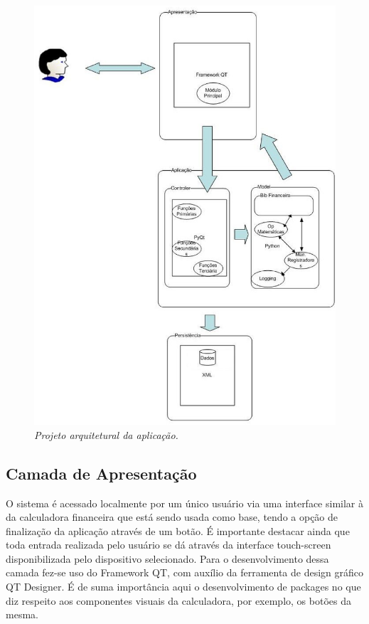 \begin{figure}[!h]
 \includegraphics[scale=0.5]{arquitetura.eps}
 \caption{\it Projeto arquitetural da aplicação.} \label{fig:arquit}
\end{figure}

\subsection{Camada de Apresentação}
O sistema é acessado localmente por um único usuário via uma interface similar à da calculadora financeira que está sendo usada como base, tendo a opção de finalização da aplicação através de um botão. É importante destacar ainda que toda entrada realizada pelo usuário se dá através da interface touch-screen disponibilizada pelo dispositivo selecionado.
Para o desenvolvimento dessa camada fez-se uso do Framework QT, com auxílio da ferramenta de design gráfico QT Designer. É de suma importância aqui o desenvolvimento de packages no que diz respeito aos componentes visuais da calculadora, por exemplo, os botões da mesma.

